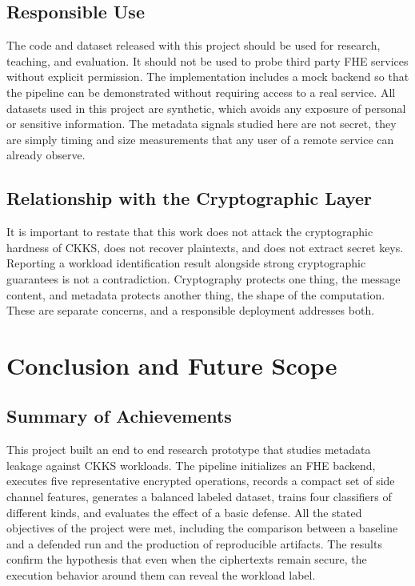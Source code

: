 \documentclass[12pt,a4paper]{article}
\begin{document}
\subsection{Responsible Use}
The code and dataset released with this project should be used for research, teaching, and evaluation. It should not be used to probe third party FHE services without explicit permission. The implementation includes a mock backend so that the pipeline can be demonstrated without requiring access to a real service. All datasets used in this project are synthetic, which avoids any exposure of personal or sensitive information. The metadata signals studied here are not secret, they are simply timing and size measurements that any user of a remote service can already observe.

\subsection{Relationship with the Cryptographic Layer}
It is important to restate that this work does not attack the cryptographic hardness of CKKS, does not recover plaintexts, and does not extract secret keys. Reporting a workload identification result alongside strong cryptographic guarantees is not a contradiction. Cryptography protects one thing, the message content, and metadata protects another thing, the shape of the computation. These are separate concerns, and a responsible deployment addresses both.

\section{Conclusion and Future Scope}

\subsection{Summary of Achievements}
This project built an end to end research prototype that studies metadata leakage against CKKS workloads. The pipeline initializes an FHE backend, executes five representative encrypted operations, records a compact set of side channel features, generates a balanced labeled dataset, trains four classifiers of different kinds, and evaluates the effect of a basic defense. All the stated objectives of the project were met, including the comparison between a baseline and a defended run and the production of reproducible artifacts. The results confirm the hypothesis that even when the ciphertexts remain secure, the execution behavior around them can reveal the workload label.
\end{document}
